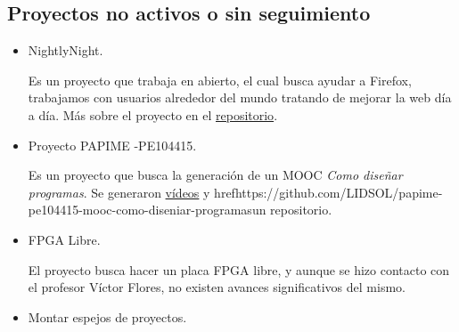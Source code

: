 \documentclass[a4paper,11pt]{article}                 %
\begin{document}
  \subsection{Proyectos no activos o sin seguimiento}
  \begin{itemize}
    \item NightlyNight. 
    
    Es un proyecto que trabaja en abierto, el cual busca ayudar a Firefox, trabajamos con usuarios alrededor del mundo tratando de mejorar la web día a día. Más sobre el proyecto en el \href{https://github.com/LIDSOL/nightlynight}{repositorio}.
    \item Proyecto PAPIME -PE104415.
    
    Es un proyecto que busca la generación de un MOOC \textit{Como diseñar programas}. Se generaron \href{https://www.youtube.com/channel/UCwHFqMqxUcCAJSdek3e4zOw}{vídeos} y href{https://github.com/LIDSOL/papime-pe104415-mooc-como-diseniar-programas}{un repositorio}.
    \item FPGA Libre.
    
    El proyecto busca hacer un placa FPGA libre, y aunque se hizo contacto con el profesor Víctor Flores, no existen avances significativos del mismo.
    \item Montar espejos de proyectos.
  \end{itemize}
\end{document}
